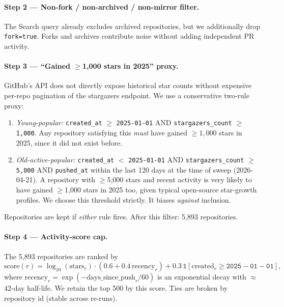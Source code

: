 \paragraph{Step 2 — Non-fork / non-archived / non-mirror filter.} The Search query already excludes archived repositories, but we additionally drop \texttt{fork=true}. Forks and archives contribute noise without adding independent PR activity.

\paragraph{Step 3 — ``Gained $\geq$1{,}000 stars in 2025'' proxy.} GitHub's API does not directly expose historical star counts without expensive per-repo pagination of the stargazers endpoint. We use a conservative two-rule proxy:
\begin{enumerate}
\item \emph{Young-popular:} \texttt{created\_at} $\geq$ \texttt{2025-01-01} AND \texttt{stargazers\_count} $\geq$ \texttt{1{,}000}. Any repository satisfying this \emph{must} have gained $\geq 1{,}000$ stars in 2025, since it did not exist before.
\item \emph{Old-active-popular:} \texttt{created\_at} $<$ \texttt{2025-01-01} AND \texttt{stargazers\_count} $\geq$ \texttt{5{,}000} AND \texttt{pushed\_at} within the last 120 days at the time of sweep (2026-04-21). A repository with $\geq$5{,}000 stars and recent activity is very likely to have gained $\geq$1{,}000 stars in 2025 too, given typical open-source star-growth profiles. We choose this threshold strictly. It biases \emph{against} inclusion.
\end{enumerate}
Repositories are kept if \emph{either} rule fires. After this filter: 5{,}893 repositories.

\paragraph{Step 4 — Activity-score cap.} The 5{,}893 repositories are ranked by
\[
\mathrm{score}(r) = \log_{10}(\mathrm{stars}_r) \cdot (0.6 + 0.4\,\mathrm{recency}_r) + 0.3\,\mathbb{1}[\mathrm{created}_r \geq \mathtt{2025{-}01{-}01}],
\]
where $\mathrm{recency}_r = \exp(-\mathrm{days\_since\_push}_r / 60)$ is an exponential decay with $\approx$42-day half-life. We retain the top 500 by this score. Ties are broken by repository id (stable across re-runs).

